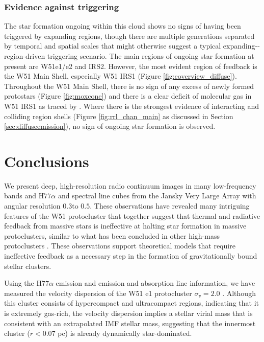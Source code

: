\subsubsection{Evidence against triggering}
The star formation ongoing within this cloud shows no signs of having been
triggered by expanding \hii regions, though there are multiple generations
separated by temporal and spatial scales that might otherwise suggest a typical
expanding-\hii-region-driven triggering
scenario.  The main regions of ongoing star formation at present are W51e1/e2
and IRS2.  However, the most evident region of feedback is the W51 Main Shell,
especially W51 IRS1 
(Figure \ref{fig:coverview_diffuse}).  Throughout the W51 Main Shell, there is no sign
of any excess of newly formed protostars (Figure \ref{fig:moxconc}) and there
is a clear deficit of molecular gas in W51 IRS1 as traced by \ceighteeno \citep[Figure
\ref{fig:contonco};][]{Parsons2012a}.  Where there is the
strongest evidence of interacting and colliding \hii region shells (Figure
\ref{fig:rrl_chan_main} as discussed in Section \ref{sec:diffuseemission}),
no sign of ongoing star formation is observed.


\section{Conclusions}
\label{sec:conclusion}
We present deep, high-resolution radio continuum images in many low-frequency
bands and H$77\alpha$ and \ortho \twotwo spectral line cubes  from the Jansky
Very Large Array with angular resolution $0.3$\arcsec to $0.5$\arcsec.   These
observations have revealed many intriguing features of the W51 protocluster
that together suggest that thermal and radiative feedback from massive stars is
ineffective at halting star formation in massive protoclusters, similar to what
has been concluded in other high-mass protoclusters \citep[e.g.][]{Ginsburg2012a,
Galvan-Madrid2013b}.
These observations support theoretical models that require ineffective feedback
as a necessary step in the formation of gravitationally bound stellar clusters.

 Using the H$77\alpha$ emission and \formaldehyde emission and absorption line
 information, we have measured the velocity dispersion of the W51 e1
 protocluster $\sigma_v=2.0$ \kms.  Although this cluster consists of
 hypercompact and ultracompact \hii regions, indicating that it is extremely
 gas-rich, the velocity dispersion implies a stellar virial mass that is
 consistent with an extrapolated IMF stellar mass, suggesting that the
 innermost cluster ($r<0.07$ pc) is already dynamically star-dominated.

